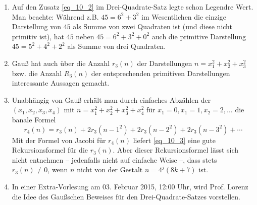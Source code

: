 \begin{enumerate}[1)]
	\item Auf den Zusatz \eqref{eq_10_2} im Drei-Quadrate-Satz legte schon Legendre Wert. Man beachte: Während z.B. $45 = 6^2+3^2$ im Wesentlichen die einzige Darstellung von $45$ als Summe von zwei Quadraten ist (und diese nicht primitiv ist), hat $45$ neben $45 = 6^2+3^2+0^2$ auch die primitive Darstellung $45 = 5^2+4^2+2^2$ als Summe von drei Quadraten.
	\item Gauß hat auch über die Anzahl $r_3(n)$ der Darstellungen $n = x_1^2 + x_2^2+x_3^2$ bzw. die Anzahl $R_3(n)$ der entsprechenden primitiven Darstellungen interessante Aussagen gemacht.
	\item Unabhängig von Gauß erhält man durch einfaches Abzählen der $(x_1,x_2,x_3,x_4)$ mit $n = x_1^2+x_2^2+x_3^2+x_4^2$ für $x_1 = 0, x_1=1, x_2 =2, \dots$ die banale Formel
	\begin{equation}
		r_4(n) = r_3(n) + 2r_3(n-1^2) + 2r_3(n-2^2) + 2r_3(n-3^2)+ \cdots \label{eq_10_3}
	\end{equation}
	Mit der Formel von Jacobi für $r_4(n)$ liefert \eqref{eq_10_3} eine gute Rekursionsformel für die $r_3(n)$. Aber dieser Rekursionsformel lässt sich nicht entnehmen -- jedenfalls nicht auf einfache Weise --, dass stets $r_3(n) \neq 0$, wenn $n$ nicht von der Gestalt $n = 4^j(8k+7)$ ist.
	\item In einer Extra-Vorlesung am 03. Februar 2015, 12:00 Uhr, wird Prof. Lorenz die Idee des Gaußschen Beweises für den Drei-Quadrate-Satzes vorstellen.
\end{enumerate}
\cleardoubleemptypage